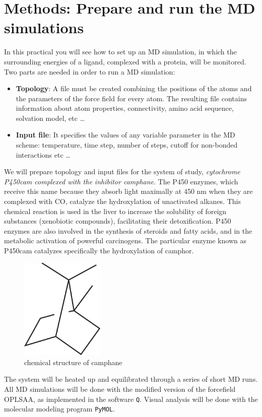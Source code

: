 \documentclass[a4paper,12pt]{article}
\newcommand{\q}{\texttt{Q}}
\newcommand{\pymol}{\texttt{PyMOL}}
\begin{document}
\section{Methods: Prepare and run the MD simulations}
In this practical you will see how to set up an MD simulation, in which the surrounding energies of a ligand, complexed with a protein, will be monitored.\\
Two parts are needed in order to run a MD simulation:
\begin {itemize}
\item {\bf Topology}: A file must be created combining the positions of the atoms and the parameters of the force field for every atom. The resulting file contains information about atom properties, connectivity, amino acid sequence, solvation model, etc \ldots
\item {\bf Input file}: It specifies the values of any variable parameter in the MD scheme: temperature, time step, number of steps, cutoff for non-bonded interactions etc \ldots
\end {itemize}
We will prepare topology and input files for the system of study, {\it cytochrome P450cam complexed with the inhibitor camphane}. The P450 enzymes, which receive this name because they absorb light maximally at 450 nm when they are complexed with CO, catalyze the hydroxylation of unactivated alkanes. This chemical reaction is used in the liver to increase the solubility of foreign substances (xenobiotic compounds), facilitating their detoxification. P450 enzymes are also involved in the synthesis of steroids and fatty acids, and in the metabolic activation of powerful carcinogens. The particular enzyme known as P450cam catalyzes specifically the hydroxylation of camphor.\\
\begin{figure}[ht]
\centering
\includegraphics[width=4cm]{camphane.png}
\caption{\label{cam} chemical structure of camphane}
\end{figure}
The system will be heated up and equilibrated through a series of
short MD runs. All MD simulations will be done with the modified
version of the forcefield OPLSAA, as implemented in the software
{\q}. Visual analysis will be done with the molecular modeling
program {\pymol}.
\end{document}
